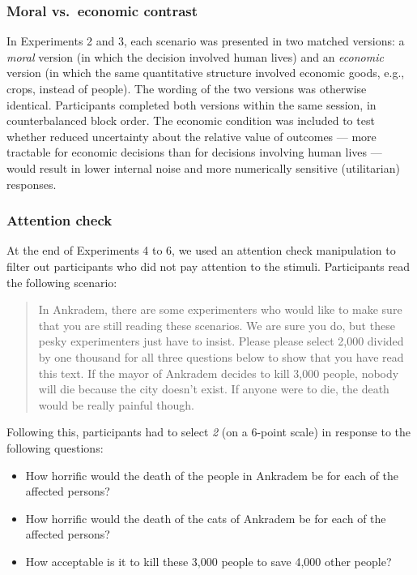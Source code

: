 \documentclass[
]{article}
\providecommand{\tightlist}{%
  \setlength{\itemsep}{0pt}\setlength{\parskip}{0pt}}
\begin{document}
\subsubsection{Moral vs.~economic contrast}\label{moral-vs.-economic-contrast}

In Experiments 2 and 3, each scenario was presented in two matched versions: a \emph{moral} version (in which the decision involved human lives) and an \emph{economic} version (in which the same quantitative structure involved economic goods, e.g., crops, instead of people). The wording of the two versions was otherwise identical. Participants completed both versions within the same session, in counterbalanced block order. The economic condition was included to test whether reduced uncertainty about the relative value of outcomes --- more tractable for economic decisions than for decisions involving human lives --- would result in lower internal noise and more numerically sensitive (utilitarian) responses.

\subsubsection{Attention check}\label{attention-check}

At the end of Experiments 4 to 6, we used an attention check manipulation to filter out participants who did not pay attention to the stimuli. Participants read the following scenario:

\begin{quote}
In Ankradem, there are some experimenters who would like to make sure that you are still reading these scenarios. We are sure you do, but these pesky experimenters just have to insist. Please please select 2,000 divided by one thousand for all three questions below to show that you have read this text.
If the mayor of Ankradem decides to kill 3,000 people, nobody will die because the city doesn't exist. If anyone were to die, the death would be really painful though.
\end{quote}

Following this, participants had to select \emph{2} (on a 6-point scale) in response to the following questions:

\begin{itemize}
\tightlist
\item
  How horrific would the death of the people in Ankradem be for each of the affected persons?
\item
  How horrific would the death of the cats of Ankradem be for each of the affected persons?
\item
  How acceptable is it to kill these 3,000 people to save 4,000 other people?
\end{itemize}
\end{document}
